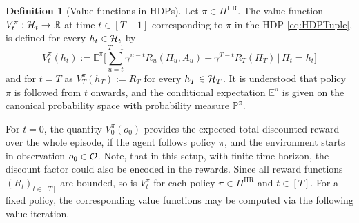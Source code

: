 \documentclass[
    a4paper,
    11pt,
    bibliography=totoc,
    listof=totoc,      
    headinclude=true,
    cleardoublepage=empty,
]{scrbook}
\theoremstyle{plain}
\theoremstyle{definition}
\newtheorem{definition}[theorem]{Definition}
\theoremstyle{remark}
\newcommand{\SetR}{\mathbb R}
\newcommand{\E}{\mathbb E}
\newcommand{\PM}{\mathbb P}
\newcommand{\SpaceO}{{\cal O}}
\newcommand{\SpaceH}{{\cal H}}
\begin{document}
\begin{definition}[Value functions in HDPs]
\label{def:HDPValueFunctions}
    Let $\pi\in\Pi^\text{HR}$. The value function $V_t^\pi:\SpaceH_t 
    \to \SetR$ at time $t\in[T-1]$ corresponding to $\pi$ in the HDP 
    \eqref{eq:HDPTuple}, is defined for every $h_t\in\SpaceH_t$ by
    \begin{equation}
    \label{eq:HDPValueFunction}
        V^\pi_t(h_t) 
        := \E^\pi\bigg[
            \sum_{u=t}^{T-1} \gamma^{u-t} R_u(H_u, A_u) + \gamma^{T-t} R_T(H_T)
            \,\bigg|\, H_t = h_t
        \bigg]
    \end{equation}
    and for $t=T$ as $V^\pi_T(h_T):=R_T$ for every $h_T\in\SpaceH_T$. It is
    understood that policy $\pi$ is followed from $t$ onwards, and the
    conditional expectation $\E^\pi$ is given on the canonical probability 
    space with probability measure $\PM^\pi$.
\end{definition}

For $t=0$, the quantity $V_0^\pi(o_0)$ provides the expected total discounted 
reward over the whole episode, if the agent follows policy $\pi$, and
the environment starts in observation $o_0\in\SpaceO$. Note, that in this 
setup, with finite time horizon, the discount factor could also be encoded in 
the rewards. Since all reward functions $(R_t)_{t\in[T]}$ are bounded, so is 
$V_t^\pi$ for each policy $\pi\in\Pi^\text{HR}$ and $t\in[T]$. For a fixed 
policy, the corresponding value functions may be computed via the following 
value iteration.
\end{document}
